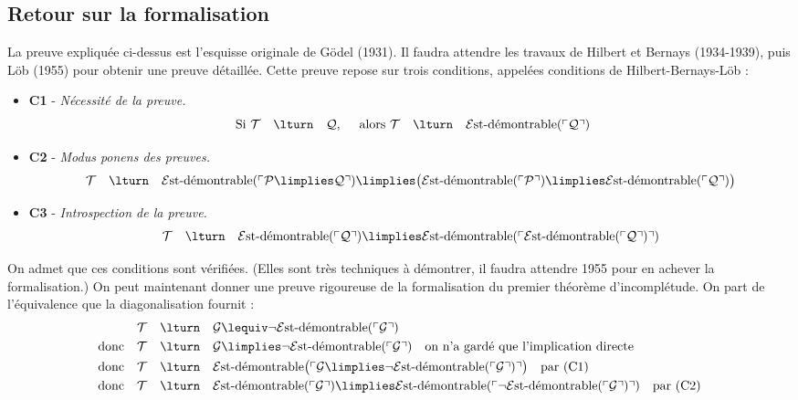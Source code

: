 \documentclass[11pt,class=report,crop=false]{standalone}
\begin{document}
\subsection{Retour sur la formalisation}

La preuve expliquée ci-dessus est l'esquisse originale de Gödel (1931). Il faudra attendre les travaux de Hilbert et Bernays (1934-1939), puis Löb (1955) pour obtenir une preuve détaillée. Cette preuve repose sur trois conditions, appelées \og{}conditions de Hilbert-Bernays-Löb\fg{} :

\begin{itemize}
    \item \textbf{C1} - \emph{Nécessité de la preuve.}
    \[
    \text{ Si } \mathcal{T} \quad \lturn \quad \mathcal{Q}, \quad \text{ alors } \mathcal{T} \quad \lturn \quad \mathcal{E}\text{st-démontrable}(\ulcorner \mathcal{Q} \urcorner)
    \]

    \item \textbf{C2} - \emph{Modus ponens des preuves.}
    \[
    \mathcal{T} \quad \lturn \quad \mathcal{E}\text{st-démontrable}(\ulcorner \mathcal{P} \limplies \mathcal{Q} \urcorner) \limplies \big( \mathcal{E}\text{st-démontrable}(\ulcorner \mathcal{P} \urcorner) \limplies \mathcal{E}\text{st-démontrable}(\ulcorner \mathcal{Q} \urcorner) \big) 
    \]

    \item \textbf{C3} - \emph{Introspection de la preuve.}
    \[
    \mathcal{T} \quad \lturn \quad \mathcal{E}\text{st-démontrable}(\ulcorner \mathcal{Q} \urcorner) \limplies \mathcal{E}\text{st-démontrable}(\ulcorner \mathcal{E}\text{st-démontrable}(\ulcorner \mathcal{Q} \urcorner) \urcorner)
    \]
\end{itemize}

\bigskip

On admet que ces conditions sont vérifiées. (Elles sont très techniques à démontrer, il faudra attendre 1955 pour en achever la formalisation.)
On peut maintenant donner une preuve rigoureuse de la formalisation du premier théorème d'incomplétude. On part de l'équivalence que la diagonalisation fournit :
\begin{align*}
    & \mathcal{T} \quad \lturn \quad \mathcal{G} \lequiv \lnot \mathcal{E}\text{st-démontrable}(\ulcorner \mathcal{G} \urcorner) \\
    \text{donc} \quad & \mathcal{T} \quad \lturn \quad \mathcal{G} \limplies \lnot \mathcal{E}\text{st-démontrable}(\ulcorner \mathcal{G} \urcorner) \quad \text{on n'a gardé que l'implication directe} \\
    \text{donc} \quad & \mathcal{T} \quad \lturn \quad \mathcal{E}\text{st-démontrable}\big( \ulcorner \mathcal{G} \limplies \lnot \mathcal{E}\text{st-démontrable}(\ulcorner \mathcal{G} \urcorner) \urcorner \big) \quad \text{par (C1)} \\
    \text{donc} \quad & \mathcal{T} \quad \lturn \quad \mathcal{E}\text{st-démontrable}(\ulcorner \mathcal{G} \urcorner) \limplies \mathcal{E}\text{st-démontrable}(\ulcorner \lnot \mathcal{E}\text{st-démontrable}(\ulcorner \mathcal{G} \urcorner) \urcorner) \quad \text{par (C2)}
\end{align*}
\end{document}
